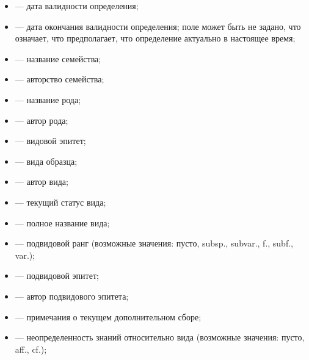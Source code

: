 \documentclass[letterpaper,10pt,russian]{sphinxmanual}
\begin{document}
\begin{itemize}
\item {} 
 — дата валидности определения;

\item {} 
 — дата окончания валидности определения; поле может быть не задано, что означает, что предполагает, что определение актуально в настоящее время;

\item {} 
 — название семейства;

\item {} 
 — авторство семейства;

\item {} 
 — название рода;

\item {} 
 — автор рода;

\item {} 
 — видовой эпитет;

\item {} 
 —  вида образца;

\item {} 
 — автор вида;

\item {} 
 — текущий статус вида;

\item {} 
 — полное название вида;

\item {} 
 — подвидовой ранг (возможные значения: пусто, subsp., subvar., f., subf., var.);

\item {} 
 — подвидовой эпитет;

\item {} 
 — автор подвидового эпитета;

\item {} 
 — примечания о текущем дополнительном сборе;

\item {} 
 — неопределенность знаний относительно вида (возможные значения: пусто, aff., cf.);

\end{itemize}
\end{document}
